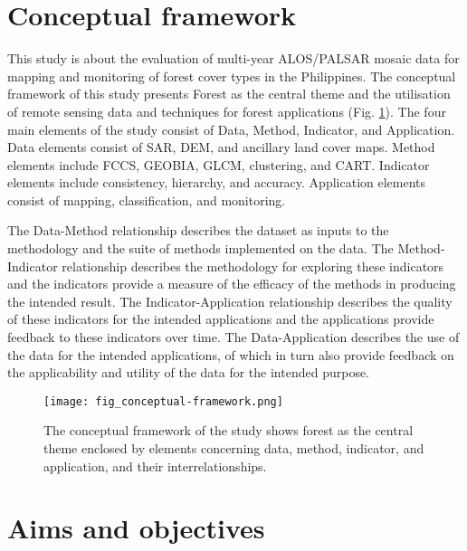 \section{Conceptual framework}
\label{sec: litrev-conceptual-framework}

This study is about the evaluation of multi-year ALOS/PALSAR mosaic data for mapping and monitoring of forest cover types in the Philippines. The conceptual framework of this study presents Forest as the central theme and the utilisation of remote sensing data and techniques for forest applications (Fig. \ref{fig: litrev-fig2.5}). The four main elements of the study consist of Data, Method, Indicator, and Application. Data elements consist of SAR, DEM, and ancillary land cover maps. Method elements include FCCS, GEOBIA, GLCM, clustering, and CART. Indicator elements include consistency, hierarchy, and accuracy. Application elements consist of mapping, classification, and monitoring.

The Data-Method relationship describes the dataset as inputs to the methodology and the suite of methods implemented on the data. The Method-Indicator relationship describes the methodology for exploring these indicators and the indicators provide a measure of the efficacy of the methods in producing the intended result. The Indicator-Application relationship describes the quality of these indicators for the intended applications and the applications provide feedback to these indicators over time. The Data-Application describes the use of the data for the intended applications, of which in turn also provide feedback on the applicability and utility of the data for the intended purpose.

\begin{figure}
	\centering
	\texttt{[image: fig\_conceptual-framework.png]}
	\caption[The conceptual framework of the study shows forest as the central theme enclosed by elements concerning data, method, indicator, and application, and their interrelationships.]{The conceptual framework of the study shows forest as the central theme enclosed by elements concerning data, method, indicator, and application, and their interrelationships.}
	\label{fig: litrev-fig2.5}
\end{figure}

\section{Aims and objectives}
\label{sec: litrev-aims-objectives}

